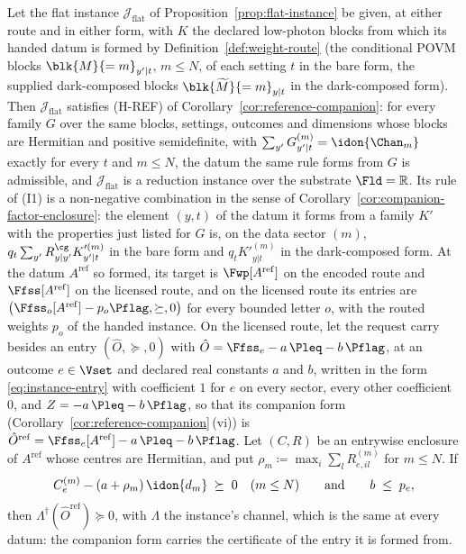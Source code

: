 \begin{corollary}\label{cor:flat-companion}
Let the flat instance $\mathcal{J}_{\mathrm{flat}}$ of
Proposition~\ref{prop:flat-instance} be given, at either route and in either
form, with $K$ the declared low-photon blocks from which its handed datum is
formed by Definition~\ref{def:weight-route} (the conditional POVM blocks
$\blk{M}{=m}_{y'|t}$, $m\le N$, of each setting $t$ in the bare form, the
supplied dark-composed blocks $\blk{\widetilde M}{=m}_{y|t}$ in the
dark-composed form). Then $\mathcal{J}_{\mathrm{flat}}$ satisfies (H-REF) of
Corollary~\ref{cor:reference-companion}: for every family $G$ over the same
blocks, settings, outcomes and dimensions whose blocks are Hermitian and
positive semidefinite, with $\sum_{y'}G^{(m)}_{y'|t}=\idon{\Chan_m}$ exactly
for every $t$ and $m\le N$, the datum the same rule forms from $G$ is
admissible, and $\mathcal{J}_{\mathrm{flat}}$ is a reduction instance over
the substrate $\Fld=\mathbb{R}$. Its rule of (I1) is a non-negative
combination in the sense of Corollary~\ref{cor:companion-factor-enclosure}:
the element $(y,t)$ of the datum it forms from a family $K'$ with the
properties just listed for $G$ is, on the data sector $(m)$, $q_t\sum_{y'}R^{\cg}_{y|y'}K'^{(m)}_{y'|t}$ in the bare
form and $q_tK'^{(m)}_{y|t}$ in the dark-composed form. At the datum $A^{\mathrm{ref}}$ so formed,
its target is $\Fwp[A^{\mathrm{ref}}]$ on the encoded route and
$\Ffss[A^{\mathrm{ref}}]$ on the licensed route, and on the licensed route its
entries are $\big(\Ffss_o[A^{\mathrm{ref}}]-p_o\Pflag,\succeq,0\big)$ for
every bounded letter $o$, with the routed weights $p_o$ of the handed
instance. On the licensed route, let the request carry besides an entry
$(\hat O,\succeq,0)$ with $\hat O=\Ffss_e-a\,\Pleq-b\,\Pflag$, at an outcome
$e\in\Vset$ and declared real constants $a$ and $b$, written in the form
\eqref{eq:instance-entry} with coefficient $1$ for $e$ on every sector, every
other coefficient $0$, and $Z=-a\,\Pleq-b\,\Pflag$, so that its companion form
(Corollary~\ref{cor:reference-companion}\,(vi)) is
$\hat O^{\mathrm{ref}}=\Ffss_e[A^{\mathrm{ref}}]-a\,\Pleq-b\,\Pflag$. Let
$(C,R)$ be an entrywise enclosure of $A^{\mathrm{ref}}$ whose centres are
Hermitian, and put $\rho_m\coloneqq\max_i\sum_lR^{(m)}_{e,il}$ for $m\le N$.
If
\begin{equation}\label{eq:companion-two-sector}
  C^{(m)}_e-(a+\rho_m)\,\idon{d_m}\;\succeq\;0\quad(m\le N)
  \qquad\text{and}\qquad b\;\le\;p_e ,
\end{equation}
then $\Lambda^{\dagger}(\hat O^{\mathrm{ref}})\succeq0$, with $\Lambda$ the
instance's channel, which is the same at every datum: the companion form
carries the certificate of the entry it is formed from.
\end{corollary}

